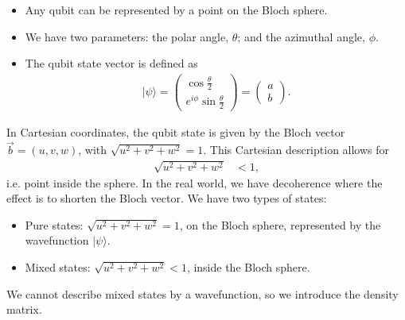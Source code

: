 \documentclass[lasers.tex]{subfiles}
\begin{document}
\chapter{}
\begin{itemize}
    \item Any qubit can be represented by a point on the Bloch sphere. 
    \item We have two parameters: the polar angle, $\theta$; and the azimuthal angle, $\phi$.
    \item The qubit state vector is defined as
        \begin{align}
            |\psi\rangle = \begin{pmatrix} \cos\frac{\theta}{2}\\ e^{i\phi}\sin\frac{\theta}{2}\end{pmatrix} = \begin{pmatrix} a \\ b\end{pmatrix}.
        \end{align}
\end{itemize}
In Cartesian coordinates, the qubit state is given by the Bloch vector $\vec{b}=(u,v,w)$, with $\sqrt{u^2+v^2+w^2}=1$.
This Cartesian description allows for
    \begin{align}
        \sqrt{u^2+v^2+w^2} &< 1,
    \end{align}
i.e. point inside the sphere.
In the real world, we have decoherence where the effect is to shorten the Bloch vector.
We have two types of states:
\begin{itemize}
    \item Pure states: $\sqrt{u^2+v^2+w^2}=1$, on the Bloch sphere, represented by the wavefunction $|\psi\rangle$.
    \item Mixed states: $\sqrt{u^2+v^2+w^2} < 1$, inside the Bloch sphere.
\end{itemize}
We cannot describe mixed states by a wavefunction, so we introduce the density matrix.
\end{document}
